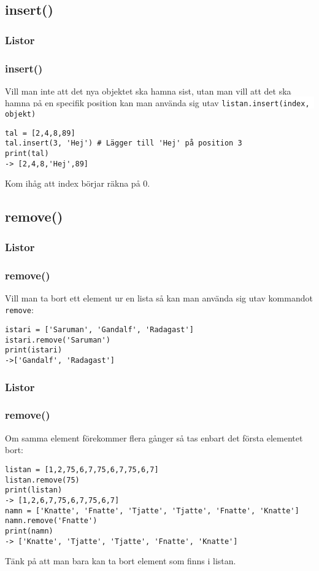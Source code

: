 \documentclass{beamer}
\newcommand{\code}[1]{\colorbox{white}{\lstinline{#1}}}
\begin{document}
\subsection{insert()}

\begin{frame}[fragile]
\frametitle{Listor}
\frametitle{insert()}

Vill man inte att det nya objektet ska hamna sist, utan man vill att det ska hamna på en specifik position kan man använda sig utav \code{listan.insert(index, objekt)}

\begin{lstlisting}
tal = [2,4,8,89]
tal.insert(3, 'Hej') # Lägger till 'Hej' på position 3
print(tal)
-> [2,4,8,'Hej',89]
\end{lstlisting}

Kom ihåg att index börjar räkna på 0.

\end{frame}

\subsection{remove()}

\begin{frame}[fragile]
\frametitle{Listor}
\frametitle{remove()}

Vill man ta bort ett element ur en lista så kan man använda sig utav kommandot \code{remove}:

\begin{lstlisting}
istari = ['Saruman', 'Gandalf', 'Radagast']
istari.remove('Saruman')
print(istari)
->['Gandalf', 'Radagast']
\end{lstlisting}

\end{frame}

\begin{frame}[fragile]
\frametitle{Listor}
\frametitle{remove()}

Om samma element förekommer flera gånger så tas enbart det första elementet bort:

\begin{lstlisting}
listan = [1,2,75,6,7,75,6,7,75,6,7]
listan.remove(75)
print(listan)
-> [1,2,6,7,75,6,7,75,6,7]
namn = ['Knatte', 'Fnatte', 'Tjatte', 'Tjatte', 'Fnatte', 'Knatte']
namn.remove('Fnatte')
print(namn)
-> ['Knatte', 'Tjatte', 'Tjatte', 'Fnatte', 'Knatte']
\end{lstlisting}

Tänk på att man bara kan ta bort element som finns i listan.

\end{frame}
\end{document}
